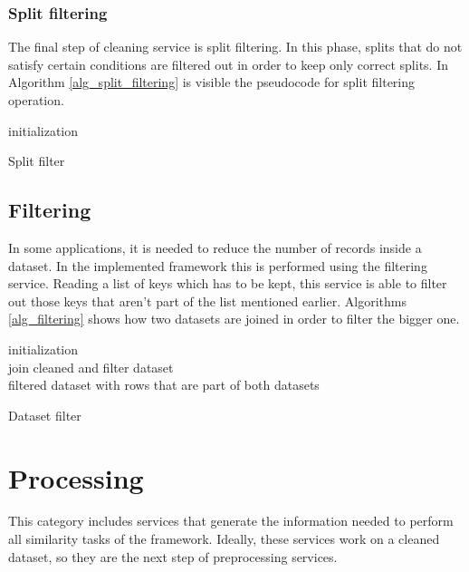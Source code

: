 \documentclass[\main/main.tex]{subfiles}
\begin{document}
\subsubsection{Split filtering}
The final step of cleaning service is split filtering. In this phase, splits that do not satisfy certain conditions are filtered out in order to keep only correct splits. In Algorithm \ref{alg_split_filtering} is visible the pseudocode for split filtering operation. 
\begin{center}
    \begin{algorithm}[H]
     initialization \\
     \caption{Split filter}
     \label{alg_split_filtering}
    \end{algorithm}
\end{center}

\subsection{Filtering}
In some applications, it is needed to reduce the number of records inside a dataset. In the implemented framework this is performed using the filtering service. Reading a list of keys which has to be kept, this service is able to filter out those keys that aren't part of the list mentioned earlier. Algorithms \ref{alg_filtering} shows how two datasets are joined in order to filter the bigger one.
\begin{center}
    \begin{algorithm}[H]
     initialization \\
     join cleaned and filter dataset \\
     \Return filtered dataset with rows that are part of both datasets
     \caption{Dataset filter}
     \label{alg_filtering}
    \end{algorithm}
\end{center}

\section{Processing}
This category includes services that generate the information needed to perform all similarity tasks of the framework. Ideally, these services work on a cleaned dataset, so they are the next step of preprocessing services. 
\end{document}
